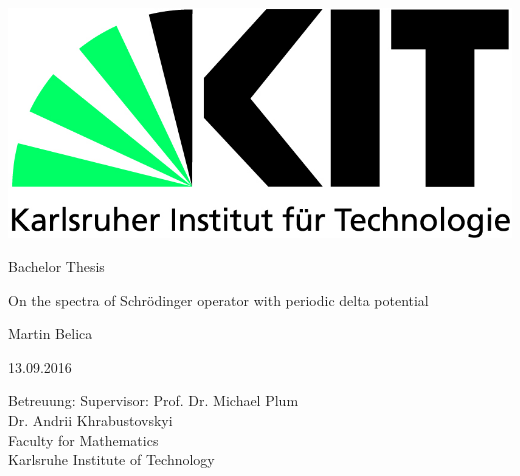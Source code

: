 \pagestyle{empty}
\begin{titlepage}

  \includegraphics[scale=0.45]{kit-logo.jpg}
  \vspace*{2cm} 

  \begin{center} \large 
    
    Bachelor Thesis
    \vspace*{2cm}

    {\huge On the spectra of Schrödinger operator with periodic delta potential}
    \vspace*{2.5cm}

    Martin Belica
    \vspace*{0.5cm}

    13.09.2016
    \vspace*{4cm}


    Betreuung: Supervisor: Prof. Dr. Michael Plum \\
    Dr. Andrii Khrabustovskyi \\[1cm]
    Faculty for Mathematics \\[1cm]
	Karlsruhe Institute of Technology
  \end{center}
\end{titlepage}